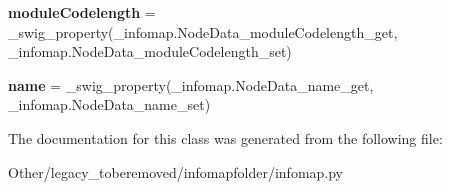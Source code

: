 \begin{DoxyCompactItemize}
\item 
\mbox{\label{classinfomapfolder_1_1infomap_1_1NodeData_a901f6598f23711e1abaf573407400c8e}} 
{\bfseries module\+Codelength} = \+\_\+swig\+\_\+property(\+\_\+infomap.\+Node\+Data\+\_\+module\+Codelength\+\_\+get, \+\_\+infomap.\+Node\+Data\+\_\+module\+Codelength\+\_\+set)
\item 
\mbox{\label{classinfomapfolder_1_1infomap_1_1NodeData_a29e2d6b5fef9acaae693f6577e6068d8}} 
{\bfseries name} = \+\_\+swig\+\_\+property(\+\_\+infomap.\+Node\+Data\+\_\+name\+\_\+get, \+\_\+infomap.\+Node\+Data\+\_\+name\+\_\+set)
\end{DoxyCompactItemize}


The documentation for this class was generated from the following file\+:\begin{DoxyCompactItemize}
\item 
Other/legacy\+\_\+toberemoved/infomapfolder/infomap.\+py\end{DoxyCompactItemize}
